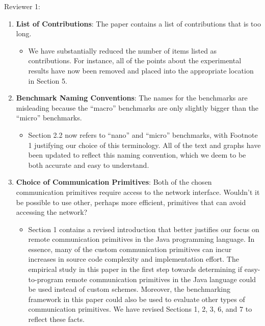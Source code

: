 \documentclass[11pt]{article}
\begin{document}
Reviewer 1: \vspace*{-.15in}
\renewcommand{\labelitemi}{$\rightarrow$}

\begin{enumerate}

  \item {\bf List of Contributions}: The paper contains a list of
    contributions that is too long. \label{item:toomany}

    \begin{itemize}

      \item We have substantially reduced the number of items listed
        as contributions.  For instance, all of the points about the
        experimental results have now been removed and placed into the
        appropriate location in Section 5.

    \end{itemize}

  \item {\bf Benchmark Naming Conventions}: The names for the
    benchmarks are misleading because the ``macro'' benchmarks are
    only slightly bigger than the ``micro'' benchmarks.

    \begin{itemize}

      \item Section 2.2 now refers to ``nano'' and ``micro''
        benchmarks, with Footnote 1 justifying our choice of this
        terminology.  All of the text and graphs have been updated to
        reflect this naming convention, which we deem to be both
        accurate and easy to understand.

    \end{itemize}

  \item {\bf Choice of Communication Primitives}: Both of the chosen
    communication primitives require access to the network interface.
    Wouldn't it be possible to use other, perhaps more efficient,
    primitives that can avoid accessing the
    network? \label{item:choice}

    \begin{itemize}

      \item Section 1 contains a revised introduction that better
        justifies our focus on remote communication primitives in the
        Java programming language.  In essence, many of the custom
        communication primitives can incur increases in source code
        complexity and implementation effort.  The empirical study in
        this paper in the first step towards determining if
        easy-to-program remote communication primitives in the Java
        language could be used instead of custom schemes.  Moreover,
        the benchmarking framework in this paper could also be used to
        evaluate other types of communication primitives.  We have
        revised Sections 1, 2, 3, 6, and 7 to reflect these facts.


\end{itemize}
\end{enumerate}
\end{document}
